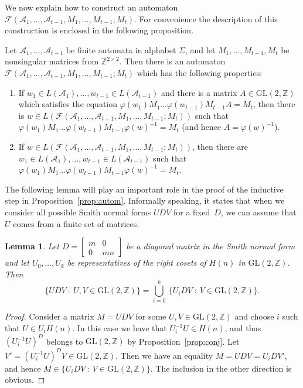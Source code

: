 \documentclass[fontsize=11pt,DIV=13,paper=letter]{scrartcl}
\newtheorem{lemma}[theorem]{Lemma}
\theoremstyle{definition}
\newcommand{\A}{\mathcal{A}}
\newcommand{\Z}{\mathbb{Z}}
\newcommand{\F}{\mathcal{F}}
\newcommand{\GL}{\mathrm{GL}(2,\Z)}
\renewcommand{\phi}{\varphi}
\begin{document}
We now explain how to construct an automaton $\F(\A_1,\dots,\A_{t-1},M_1,\dots,M_{t-1};M_t)$. For convenience the description of this construction is enclosed in the following proposition.

\begin{proposition}\label{prop:autom}
Let $\A_1,\dots,\A_{t-1}$ be finite automata in alphabet $\Sigma$, and let $M_1,\dots,M_{t-1},M_t$ be nonsingular matrices from $\Z^{2\times 2}$. Then there is an automaton $\F(\A_1,\dots,\A_{t-1},M_1,\dots,M_{t-1};M_t)$ which has the following properties:
\begin{enumerate}[(1)]
\item If $w_1\in L(\A_1),\dots,w_{t-1}\in L(\A_{t-1})$ and there is a matrix $A\in \GL$ which satisfies the equation $\phi(w_1)M_1\dots\phi(w_{t-1})M_{t-1}A=M_t$, then there is $w\in L(\F(\A_1,\dots,\A_{t-1},M_1,\dots,M_{t-1};M_t))$ such that $\phi(w_1)M_1\dots\phi(w_{t-1})M_{t-1}\phi(w)^{-1}=M_t$ (and hence $A=\phi(w)^{-1}$).

\item If $w\in L(\F(\A_1,\dots,\A_{t-1},M_1,\dots,M_{t-1};M_t))$, then there are $w_1\in L(\A_1),\dots,w_{t-1}\in L(\A_{t-1})$ such that $\phi(w_1)M_1\dots\phi(w_{t-1})M_{t-1}\phi(w)^{-1}=M_t$.
\end{enumerate}
\end{proposition}

The following lemma will play an important role in the proof of the inductive step in Proposition~\ref{prop:autom}. Informally speaking, it states that when we consider all possible Smith normal forms $\mathit{UDV}$ for a fixed~$D$, we can assume that $U$ comes from a finite set of matrices.

\begin{lemma} \label{lem:fin}
Let $D=\begin{bmatrix} m & 0\\ 0 & mn \end{bmatrix}$ be a diagonal matrix in the Smith normal form and let $U_0,\dots,U_k$ be representatives of the right cosets of $H(n)$ in $\GL$. Then
\[
\{ \mathit{UDV}\ :\ U,V\in \GL\} = \bigcup_{i=0}^k\ \{U_iDV\ :\ V\in \GL\}.
\]
\end{lemma}

\begin{proof}
Consider a matrix $M=\mathit{UDV}$ for some $U,V\in \GL$ and choose $i$ such that $U\in U_iH(n)$. In this case we have that $U_i^{-1}U\in H(n)$, and thus $(U_i^{-1}U)^D$ belongs to $\GL$ by Proposition~\ref{prop:conj}. Let $V'= (U_i^{-1}U)^DV\in \GL$. Then we have an equality $M=\mathit{UDV}=U_iDV'$, and hence $M\in \{U_iDV\ :\ V\in \GL\}$. The inclusion in the other direction is obvious.

\end{proof}
\end{document}
